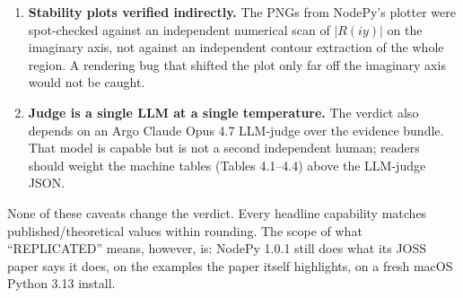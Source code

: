\documentclass[11pt]{article}
\begin{document}
\begin{enumerate}
\item \textbf{Stability plots verified indirectly.} The PNGs from
NodePy's plotter were spot-checked against an independent numerical scan
of $|R(iy)|$ on the imaginary axis, not against an independent contour
extraction of the whole region. A rendering bug that shifted the
plot only far off the imaginary axis would not be caught.

\item \textbf{Judge is a single LLM at a single temperature.} The verdict
also depends on an Argo Claude Opus 4.7 LLM-judge over the evidence
bundle. That model is capable but is not a second independent human;
readers should weight the machine tables (Tables 4.1--4.4) above the
LLM-judge JSON.

\end{enumerate}

None of these caveats change the verdict. Every headline capability
matches published/theoretical values within rounding. The scope of what
``REPLICATED'' means, however, is: NodePy 1.0.1 still does what its JOSS
paper says it does, on the examples the paper itself highlights, on a
fresh macOS Python 3.13 install.
\end{document}
